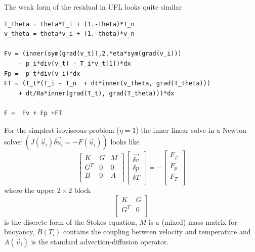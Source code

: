 The weak form of the residual in UFL looks quite similar
\begin{lstlisting}[style=UFL]
T_theta = theta*T_i + (1.-theta)*T_n
v_theta = theta*v_i + (1.-theta)*v_n 

Fv = (inner(sym(grad(v_t)),2.*eta*sym(grad(v_i)))
    - p_i*div(v_t) - T_i*v_t[1])*dx  
Fp = -p_t*div(v_i)*dx 
FT = (T_t*(T_i - T_n  + dt*inner(v_theta, grad(T_theta))) 
    + dt/Ra*inner(grad(T_t), grad(T_theta)))*dx 

F =  Fv + Fp +FT
\end{lstlisting}

For the simplest
isoviscous problem ($\eta=1$) the inner linear solve in a Newton solver
$(J\left(\vec{u}_i\right)\vec{\delta u}_i=-F\left(\vec{u}_i\right))$ looks like
\begin{equation}
  \label{eq:7}
  \left[
\begin{array}{ccc}
  K & G  & M \\
  G^{T} & 0 & 0 \\
  B & 0 & A \\ 
  \end{array}
  \right]
  \left[
    \begin{array}{c}
      \vec{\delta v} \\
      \delta p \\
      \delta T \\
    \end{array}
  \right] = -\left[
    \begin{array}{c}
      F_{\vec{v}}\\
      F_{p}\\
      F_{T}\\
    \end{array}
  \right]
\end{equation}
where the upper $2\times2$ block
\begin{displaymath}
     \left[
\begin{array}{cc}
  K & G  \\
  G^{T} & 0 \\
  \end{array}
  \right]
\end{displaymath}
is the discrete form of the Stokes equation, 
$M$ is a (mixed) mass matrix for buoyancy, $B(T_i)$ contains the
coupling between velocity and temperature and $A(\vec{v}_i)$ is the standard
advection-diffusion operator.  


